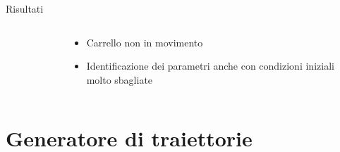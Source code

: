 \documentclass[]{beamer}
\begin{document}
	\begin{frame}{Risultati}
		\centering
		\begin{columns}
			\begin{column}{.5\textwidth}
				\centering
				\begin{figure}
					
				\end{figure}
			\end{column}
			\begin{column}{.5\textwidth}
				\centering
				\begin{itemize}
					\item Carrello non in movimento
					\item Identificazione dei parametri anche con condizioni iniziali molto sbagliate
				\end{itemize}
			\end{column}
		\end{columns}
	\end{frame}
	
	
	\section{Generatore di traiettorie}
	
\end{document}
